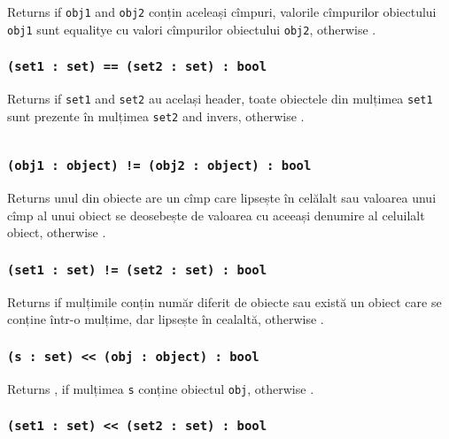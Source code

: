 Returns \true{} if \texttt{obj1} and \texttt{obj2} conțin aceleași cîmpuri, valorile cîmpurilor obiectului \texttt{obj1} sunt equalitye cu valori cîmpurilor obiectului \texttt{obj2}, otherwise \false{}.

\subsubsection{\texttt{(set1 : set) == (set2 : set) : bool}}

Returns \true{} if \texttt{set1} and \texttt{set2} au același header, toate obiectele din mulțimea \texttt{set1} sunt prezente în mulțimea \texttt{set2} and invers, otherwise \false{}.

\begin{sourcecode}
    \label{setobjopex}
    \inputminted[linenos]{icl}{../sources/setobjopex.icL}
\end{sourcecode}

\subsubsection{\texttt{(obj1 : object) != (obj2 : object) : bool}}

Returns \true{} unul din obiecte are un cîmp care lipsește în celălalt sau valoarea unui cîmp al unui obiect se deosebește de valoarea cu aceeași denumire al celuilalt obiect, otherwise \false{}.

\subsubsection{\texttt{(set1 : set) != (set2 : set) : bool}}

Returns \true{} if mulțimile conțin număr diferit de obiecte sau există un obiect care se conține într-o mulțime, dar lipsește în cealaltă, otherwise \false{}.

\subsubsection{\texttt{(s : set) << (obj : object) : bool}}

Returns \true{}, if mulțimea \texttt{s} conține obiectul \texttt{obj}, otherwise \false{}.

\subsubsection{\texttt{(set1 : set) << (set2 : set) : bool}}

